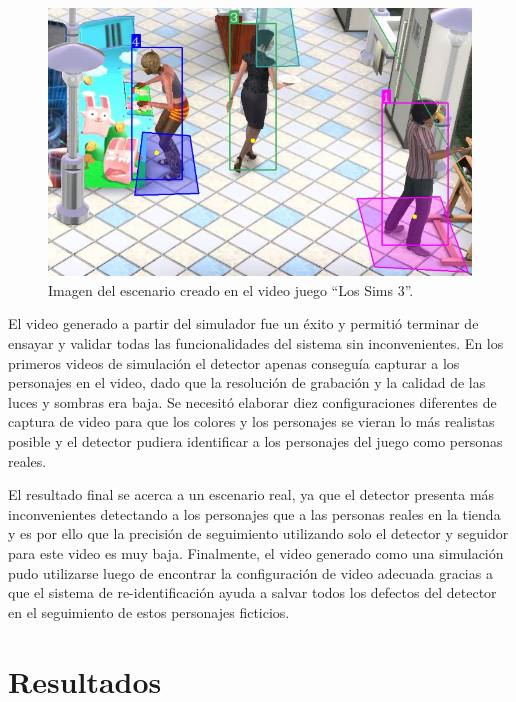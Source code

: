 \begin{figure}[ht]
	\centering
	\includegraphics[scale=.50]{./Figures/sims.jpg}
	\caption{Imagen del escenario creado en el video juego ``Los Sims 3''.}
	\label{fig:sims}
\end{figure}

\newpage

El video generado a partir del simulador fue un éxito y permitió terminar de ensayar y validar todas las funcionalidades del sistema sin inconvenientes. En los primeros videos de simulación el detector apenas conseguía capturar a los personajes en el video, dado que la resolución de grabación y la calidad de las luces y sombras era baja. Se necesitó elaborar diez configuraciones diferentes de captura de video para que los colores y los personajes se vieran lo más realistas posible y el detector pudiera identificar a los personajes del juego como personas reales.

El resultado final \citep{DEMO:2} se acerca a un escenario real, ya que el detector presenta más inconvenientes detectando a los personajes que a las personas reales en la tienda y es por ello que la precisión de seguimiento utilizando solo el detector y seguidor para este video es muy baja. Finalmente, el video generado como una simulación pudo utilizarse luego de encontrar la configuración de video adecuada gracias a que el sistema de re-identificación ayuda a salvar todos los defectos del detector en el seguimiento de estos personajes ficticios.


\section{Resultados}
\label{sec:resultados}

